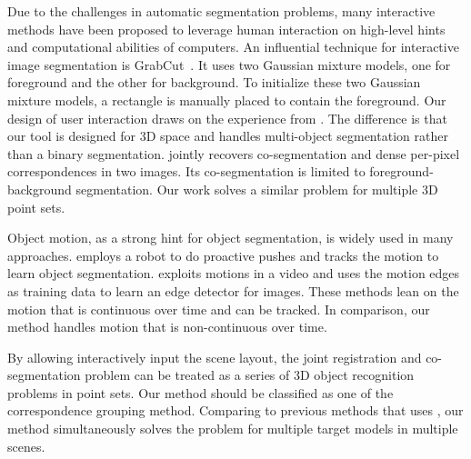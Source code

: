 %
Due to the challenges in automatic segmentation problems, many interactive methods have been proposed to leverage human interaction on high-level hints and computational abilities of computers.
%
An influential technique for interactive image segmentation is GrabCut~\cite{grabcut}. 
It uses two Gaussian mixture models, one for foreground and the other for background. 
To initialize these two Gaussian mixture models, a rectangle is manually placed to contain the foreground. 
Our design of user interaction draws on the experience from \cite{grabcut}. 
%
The difference is that our tool is designed for 3D space and handles multi-object segmentation rather than a binary segmentation. 
%
\cite{Taniai_2016_CVPR} jointly recovers co-segmentation and dense per-pixel correspondences in two images. 
Its co-segmentation is limited to foreground-background segmentation. 
Our work solves a similar problem for multiple 3D point sets. 

Object motion, as a strong hint for object segmentation, is widely used in many approaches.
\cite{Xu:2015:ACS:2816795.2818075} employs a robot to do proactive pushes and tracks the motion to learn object segmentation. 
\cite{unsupervisededge} exploits motions in a video and uses the motion edges as training data to learn an edge detector for images.
These methods lean on the motion that is continuous over time and can be tracked. 
In comparison, our method handles motion that is non-continuous over time.

By allowing interactively input the scene layout, the joint registration and co-segmentation problem can be treated as a series of 3D object recognition problems in point sets. 
%
Our method should be classified as one of the correspondence grouping method. 
Comparing to previous methods that uses \cite{hough,LOF}, our method simultaneously solves the problem for multiple target models in multiple scenes.
